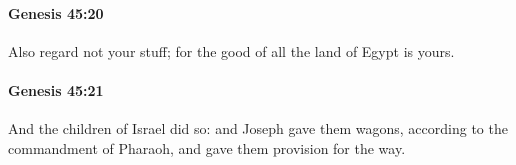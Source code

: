 		\paragraph{Genesis 45:20} %
			\label{GENESIS-45-20}

			Also regard not your stuff; for the good of all the land of Egypt is yours.


		\paragraph{Genesis 45:21} %
			\label{GENESIS-45-21}

			And the children of Israel did so: and Joseph gave them wagons, according to the commandment of Pharaoh, and gave them provision for the way.



